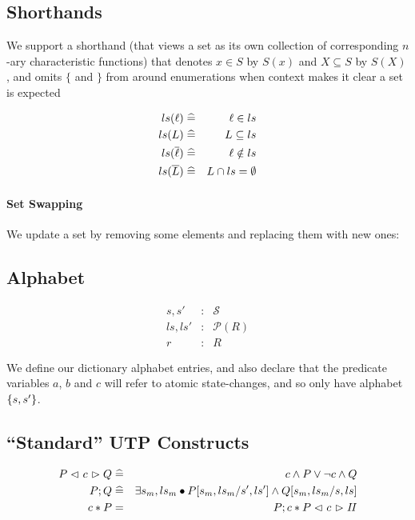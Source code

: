\subsection{Shorthands}

We support a shorthand (that views a set as its own collection
of corresponding $n$-ary characteristic functions)
that denotes $x \in S$ by $S(x)$ and $ X \subseteq S$ by $S(X)$,
and omits $\{$ and $\}$ from around enumerations when context makes
it clear a set is expected

\begin{eqnarray*}
   ls(\ell) &\mathrel{\widehat=}& \ell \in ls
\\ ls(L) &\mathrel{\widehat=}& L \subseteq ls
\\ ls(\overline{\ell}) &\mathrel{\widehat=}& \ell \notin ls
\\ ls(\overline{L}) &\mathrel{\widehat=}& L \cap ls = \emptyset
\end{eqnarray*}


\paragraph{Set Swapping}

We update a set by removing some elements
and replacing them with new ones:

\subsection{Alphabet}

\begin{eqnarray*}
   s, s' &:& \mathcal S
\\ ls, ls' &:& \mathcal P (R)
\\ r &:& R
\end{eqnarray*}

We define our dictionary alphabet entries,
and also declare that the predicate variables $a$, $b$ and $c$
will refer to atomic state-changes,
and so only have alphabet $\{{s,s'}\}$.

\subsection{``Standard'' UTP Constructs}

\begin{eqnarray*}
   P \mathrel{\lhd ~ {c} ~ \rhd} Q
   &\mathrel{\widehat=}&
   c \land P \lor \lnot c \land Q
\\ P ; Q
   &\mathrel{\widehat=}&
   \exists s_m,ls_m \bullet P[s_m,ls_m/s',ls'] \land Q[s_m,ls_m/s,ls]
\\ c * P
   &=&
   P ; c * P \mathrel{\lhd ~ {c} ~ \rhd} \mathit{II}
\end{eqnarray*}

